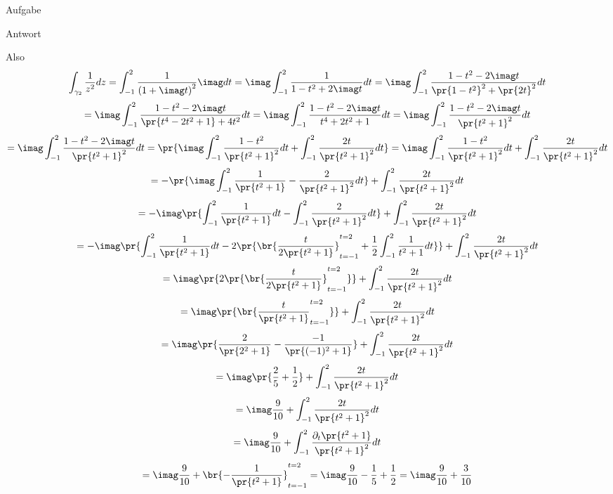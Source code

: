 \documentclass{scrartcl}
\begin{document}
\begin{section}{Aufgabe}
\begin{subsection}{Antwort}
\begin{itemize}
 Also \[\int_{\gamma_2}\frac{1}{z^2}dz
 =\int_{-1}^{2}\frac{1}{\left(1+\imag t\right)^2}\imag dt
 =\imag \int_{-1}^{2}\frac{1}{1-t^2+2\imag t}dt
 =\imag \int_{-1}^{2}\frac{1-t^2-2\imag t}{\pr{1-t^2}^2+\pr{2 t}^2}dt
 \]
 \[ =\imag \int_{-1}^{2}\frac{1-t^2-2\imag t}{\pr{t^4-2 t^2+1}+4t^2}dt
 =\imag \int_{-1}^{2}\frac{1-t^2-2\imag t}{t^4+2 t^2+1}dt
 =\imag \int_{-1}^{2}\frac{1-t^2-2\imag t}{\pr{t^2+1}^2}dt
 \]
 \[=\imag \int_{-1}^{2}\frac{1-t^2-2\imag t}{\pr{t^2+1}^2}dt
 =\pr{ \imag\int_{-1}^{2}\frac{1-t^2}{\pr{t^2+1}^2}dt+\int_{-1}^{2}\frac{2t}{\pr{t^2+1}^2}dt}
 = \imag\int_{-1}^{2}\frac{1-t^2}{\pr{t^2+1}^2}dt+\int_{-1}^{2}\frac{2t}{\pr{t^2+1}^2}dt
 \]
 \[= -\pr{\imag\int_{-1}^{2}\frac{1}{\pr{t^2+1}}-\frac{2}{\pr{t^2+1}^2}dt}+\int_{-1}^{2}\frac{2t}{\pr{t^2+1}^2}dt
 \]
 \[= -\imag\pr{\int_{-1}^{2}\frac{1}{\pr{t^2+1}}dt-\int_{-1}^{2}\frac{2}{\pr{t^2+1}^2}dt}+\int_{-1}^{2}\frac{2t}{\pr{t^2+1}^2}dt\]
 \[= -\imag\pr{\int_{-1}^{2}\frac{1}{\pr{t^2+1}}dt-2\pr{\br{\frac{t}{2\pr{t^2+1}}}_{t=-1}^{t=2}+\frac{1}{2}\int_{-1}^{2}\frac{1}{t^2+1}dt}}+\int_{-1}^{2}\frac{2t}{\pr{t^2+1}^2}dt\]
  \[= \imag\pr{2\pr{\br{\frac{t}{2\pr{t^2+1}}}_{t=-1}^{t=2}}}+\int_{-1}^{2}\frac{2t}{\pr{t^2+1}^2}dt\]
  \[= \imag\pr{\br{\frac{t}{\pr{t^2+1}}_{t=-1}^{t=2}}}+\int_{-1}^{2}\frac{2t}{\pr{t^2+1}^2}dt\]
  \[= \imag\pr{\frac{2}{\pr{2^2+1}}-\frac{-1}{\pr{(-1)^2+1}}}+\int_{-1}^{2}\frac{2t}{\pr{t^2+1}^2}dt\]
  \[= \imag\pr{\frac{2}{5}+\frac{1}{2}}+\int_{-1}^{2}\frac{2t}{\pr{t^2+1}^2}dt\]
  \[= \imag\frac{9}{10}+\int_{-1}^{2}\frac{2t}{\pr{t^2+1}^2}dt\]
  \[= \imag\frac{9}{10}+\int_{-1}^{2}\frac{\partial_t \pr{t^2+1}}{\pr{t^2+1}^2}dt\]
  \[= \imag\frac{9}{10}+\br{-\frac{1}{\pr{t^2+1}}}_{t=-1}^{t=2}
  =\imag\frac{9}{10}-\frac{1}{5}+\frac{1}{2}
  =\imag\frac{9}{10}+\frac{3}{10}\]


\end{itemize}
    
    
\end{subsection}
\end{section}
\end{document}
